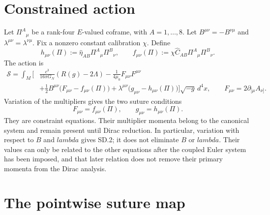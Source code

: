 \documentclass[10pt]{article}
\newcommand{\hateta}{\widehat\eta}
\newcommand{\hatC}{\widehat C}
\begin{document}

\begin{abstract}
The suture field supplies an eight-dimensional internal carrier for a
Lorentzian metric and an antisymmetric flux form. This note gives the exact
condition under which its multiplier action has the same propagating content
as Einstein--Maxwell theory. The condition is the rank-sixteen regularity of
the pointwise suture map from the thirty-two coframe coordinates to the ten
metric and six flux coordinates. On that branch the remaining sixteen coframe
coordinates are vertical gauge coordinates; the multiplier sector is
second-class; and the reduced Hamiltonian carries two gravitational and two
electromagnetic polarizations.
\end{abstract}

\section{Constrained action}

Let $\Pi^A{}_{\mu}$ be a rank-four $E$-valued coframe, with $A=1,\ldots,8$.
Let $B^{\mu\nu}=-B^{\nu\mu}$ and
$\lambda^{\mu\nu}=\lambda^{\nu\mu}$. Fix a nonzero constant calibration
$\chi$. Define
\[
h_{\mu\nu}(\Pi):=\hateta_{AB}\Pi^A{}_{\mu}\Pi^B{}_{\nu},
\qquad
f_{\mu\nu}(\Pi):=\chi\hatC_{AB}\Pi^A{}_{\mu}\Pi^B{}_{\nu}.
\tag{SD.0}
\]
The action is
\[
\begin{aligned}
\mathcal S=\int_M\Bigg[&\frac{c^3}{16\pi G_N}(R(g)-2\Lambda)
-\frac1{4\mu_0}F_{\mu\nu}F^{\mu\nu}\\
&+\frac12B^{\mu\nu}\bigl(F_{\mu\nu}-f_{\mu\nu}(\Pi)\bigr)
+\lambda^{\mu\nu}\bigl(g_{\mu\nu}-h_{\mu\nu}(\Pi)\bigr)\Bigg]
\sqrt{-g}\,d^4x,
\qquad F_{\mu\nu}=2\partial_{[\mu}A_{\nu]}.
\end{aligned}
\tag{SD.1}
\]
Variation of the multipliers gives the two suture conditions
\[
F_{\mu\nu}=f_{\mu\nu}(\Pi),
\qquad g_{\mu\nu}=h_{\mu\nu}(\Pi).
\tag{SD.2}
\]
They are constraint equations. Their multiplier momenta belong to the
canonical system and remain present until Dirac reduction.
In particular, variation with respect to $B$ and $lambda$ gives SD.2;
it does not eliminate $B$ or $lambda$. Their values can only be related to
the other equations after the coupled Euler system has been imposed, and
that later relation does not remove their primary momenta from the Dirac
analysis.

\section{The pointwise suture map}
\end{document}
